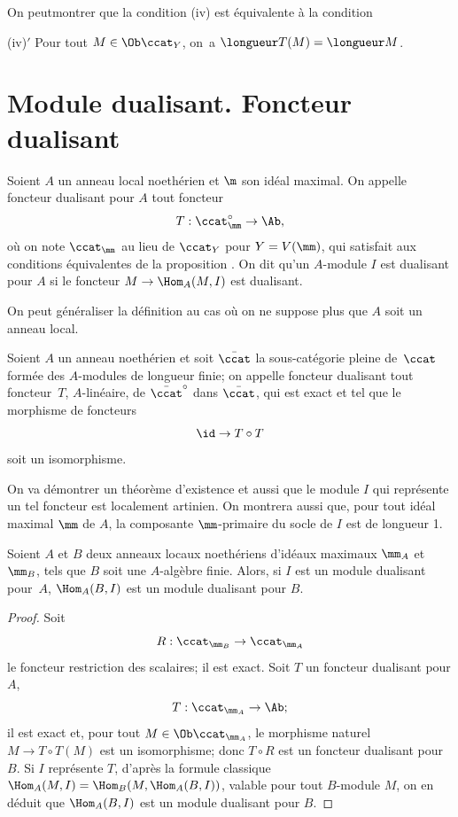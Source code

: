 \begin{remarque} \label{IV.3.2}
On peut\pageoriginale montrer que la condition (iv) est \'equivalente \`a la condition

(iv)$'$ Pour tout $M\in \Ob \ccat_{Y}$, on~a $\longueur T(M)=\longueur M$.
\end{remarque}

\section{Module dualisant. Foncteur dualisant} \label{IV.4}

\begin{definition} \label{IV.4.1}
Soient $A$ un anneau local noeth\'erien et $\m$ son id\'eal maximal. On appelle foncteur dualisant pour $A$ tout foncteur
$$
T:\ccat^{\circ}_\mm\to \Ab,
$$
o\`u on note $\ccat_{\mm}$ au lieu de $\ccat_{Y}$ pour $Y=V(\mm)$, qui satisfait aux conditions \'equivalentes de la proposition . On dit qu'un $A$-module $I$ est dualisant pour $A$ si le foncteur $M\to \Hom_{A}(M, I)$ est dualisant.
\end{definition}

On peut g\'en\'eraliser la d\'efinition  au cas o\`u on ne suppose plus que $A$ soit un anneau local.

\begin{definition} \label{IV.4.2}
Soient $A$ un anneau noeth\'erien et soit $\bar{\ccat}$ la sous-cat\'egorie pleine de~$\ccat$ form\'ee des $A$-modules de longueur finie; on appelle foncteur dualisant tout foncteur~$T$, $A$-lin\'eaire, de $\bar{\ccat}^{\circ}$ dans $\bar{\ccat}$, qui est exact et tel que le morphisme de foncteurs
$$
\id \to T\circ T
$$
soit un isomorphisme.
\end{definition}

On va d\'emontrer un th\'eor\`eme d'existence et aussi que le module $I$ qui repr\'esente un tel foncteur est localement artinien. On montrera aussi que, pour tout id\'eal maximal $\mm$ de $A$, la composante $\mm$-primaire du socle de $I$ est de longueur 1.

\begin{proposition} \label{IV.4.3}
Soient $A$ et $B$ deux anneaux locaux noeth\'eriens d'id\'eaux maximaux $\mm_{A}$ et $\mm_{B}$, tels que $B$ soit une $A$-alg\`ebre finie. Alors, si $I$ est un module dualisant pour~$A$, $\Hom_{A}(B, I)$ est un module dualisant pour $B$.
\end{proposition}

\begin{proof}
Soit\pageoriginale
$$
R: \ccat_{\mm_{B}}\to \ccat_{\mm_{A}}
$$
le foncteur restriction des scalaires; il est exact. Soit $T$ un foncteur dualisant pour $A$,
$$
T: \ccat_{\mm_{A}}\to \Ab;
$$
il est exact et, pour tout $M\in \Ob \ccat_{\mm_{A}}$, le morphisme naturel $M\to T\circ T(M)$ est un isomorphisme; donc $T\circ R$ est un foncteur dualisant pour $B$. Si $I$ repr\'esente $T$, d'apr\`es la formule classique $\Hom_{A}(M, I)=\Hom_{B}(M, \Hom_{A}(B, I))$, valable pour tout $B$-module $M$, on en d\'eduit que $\Hom_{A}(B, I)$ est un module dualisant pour $B$.
\skipqed
\end{proof}

